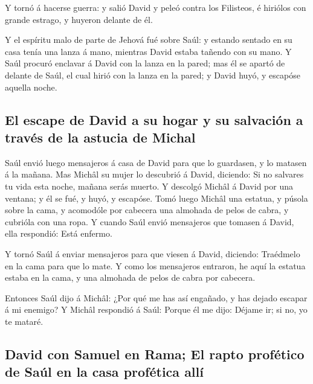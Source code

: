  Y tornó á hacerse guerra: y salió David y peleó contra los
Filisteos, é hiriólos con grande estrago, y huyeron delante de él.

 Y el espíritu malo de parte de Jehová fué sobre Saúl: y
estando sentado en su casa tenía una lanza á mano, mientras David estaba
tañendo con su mano.  Y Saúl procuró enclavar á David con
la lanza en la pared; mas él se apartó de delante de Saúl, el cual hirió
con la lanza en la pared; y David huyó, y escapóse aquella noche.

\hypertarget{el-escape-de-david-a-su-hogar-y-su-salvaciuxf3n-a-travuxe9s-de-la-astucia-de-michal}{%
\subsection{El escape de David a su hogar y su salvación a través de la
astucia de
Michal}\label{el-escape-de-david-a-su-hogar-y-su-salvaciuxf3n-a-travuxe9s-de-la-astucia-de-michal}}

 Saúl envió luego mensajeros á casa de David para que lo
guardasen, y lo matasen á la mañana. Mas Michâl su mujer lo descubrió á
David, diciendo: Si no salvares tu vida esta noche, mañana serás muerto.
 Y descolgó Michâl á David por una ventana; y él se fué, y
huyó, y escapóse.  Tomó luego Michâl una estatua, y púsola
sobre la cama, y acomodóle por cabecera una almohada de pelos de cabra,
y cubrióla con una ropa.  Y cuando Saúl envió mensajeros
que tomasen á David, ella respondió: Está enfermo.

 Y tornó Saúl á enviar mensajeros para que viesen á David,
diciendo: Traédmelo en la cama para que lo mate.  Y como
los mensajeros entraron, he aquí la estatua estaba en la cama, y una
almohada de pelos de cabra por cabecera.

 Entonces Saúl dijo á Michâl: ¿Por qué me has así engañado,
y has dejado escapar á mi enemigo? Y Michâl respondió á Saúl: Porque él
me dijo: Déjame ir; si no, yo te mataré.

\hypertarget{david-con-samuel-en-rama-el-rapto-profuxe9tico-de-sauxfal-en-la-casa-profuxe9tica-alluxed}{%
\subsection{David con Samuel en Rama; El rapto profético de Saúl en la
casa profética
allí}\label{david-con-samuel-en-rama-el-rapto-profuxe9tico-de-sauxfal-en-la-casa-profuxe9tica-alluxed}}


